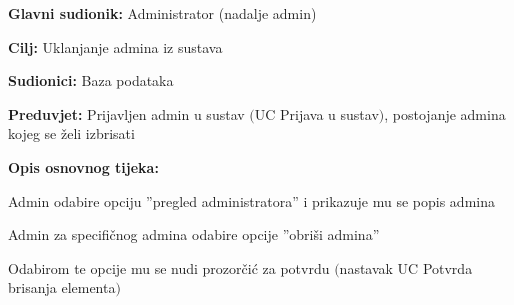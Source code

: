 \noindent {}
\begin{packed_item}

	\item \textbf{Glavni sudionik: } Administrator (nadalje admin)
	\item  \textbf{Cilj:} Uklanjanje admina iz sustava
	\item  \textbf{Sudionici:} Baza podataka
	\item  \textbf{Preduvjet:} Prijavljen admin u sustav $($UC Prijava u sustav$)$, postojanje
	admina kojeg se želi izbrisati
	\item  \textbf{Opis osnovnog tijeka:}
	
	\item[] \begin{packed_enum}

		\item Admin odabire opciju ”pregled administratora” i prikazuje mu se popis admina
		\item Admin za specifičnog admina odabire opcije ”obriši admina”
		\item Odabirom te opcije mu se nudi prozorčić za potvrdu $($nastavak UC Potvrda brisanja elementa$)$
	\end{packed_enum}
	
\end{packed_item}

